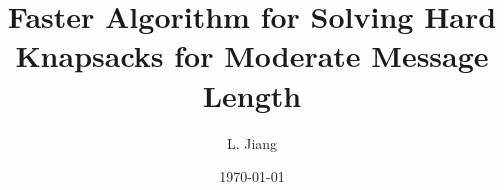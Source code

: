 \documentclass[UTF-8]{ctexart}
\begin{document}
\title{Faster Algorithm for Solving Hard Knapsacks for Moderate Message
Length}

\author{L. Jiang}

\date{\today}

\maketitle

\tableofcontents









\end{document}
